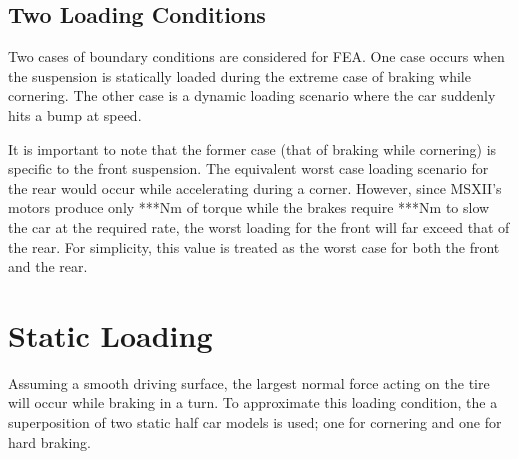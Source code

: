 \documentclass[12pt]{article}
\begin{document}
\subsection{Two Loading Conditions}
Two cases of boundary conditions are considered for FEA. One case occurs when the suspension is statically loaded during the extreme case of braking while cornering. The other case is a dynamic loading scenario where the car suddenly hits a bump at speed. 

It is important to note that the former case (that of braking while cornering) is specific to the front suspension. The equivalent worst case loading scenario for the rear would occur while accelerating during a corner. However, since MSXII's motors produce only ***Nm of torque while the brakes require ***Nm to slow the car at the required rate, the worst loading for the front will far exceed that of the rear. For simplicity, this value is treated as the worst case for both the front and the rear. 

\section{Static Loading}
\label{sec:paramSelection}
Assuming a smooth driving surface, the largest normal force acting on the tire will occur while braking in a turn. To approximate this loading condition, the a superposition of two static half car models is used; one for cornering and one for hard braking.  
\end{document}
